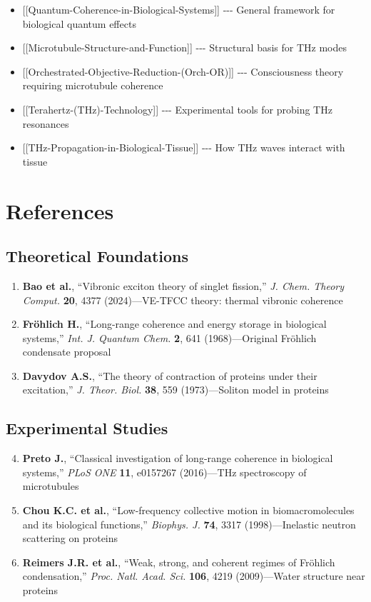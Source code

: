 \begin{itemize}
\tightlist
\item
  {[}{[}Quantum-Coherence-in-Biological-Systems{]}{]} -\/-\/- General
  framework for biological quantum effects
\item
  {[}{[}Microtubule-Structure-and-Function{]}{]} -\/-\/- Structural
  basis for THz modes
\item
  {[}{[}Orchestrated-Objective-Reduction-(Orch-OR){]}{]} -\/-\/-
  Consciousness theory requiring microtubule coherence
\item
  {[}{[}Terahertz-(THz)-Technology{]}{]} -\/-\/- Experimental tools for
  probing THz resonances
\item
  {[}{[}THz-Propagation-in-Biological-Tissue{]}{]} -\/-\/- How THz waves
  interact with tissue
\end{itemize}

\section{References}

\subsection*{Theoretical Foundations}

\begin{enumerate}
\item \textbf{Bao et al.}, ``Vibronic exciton theory of singlet fission,'' \emph{J. Chem. Theory Comput.} \textbf{20}, 4377 (2024)---VE-TFCC theory: thermal vibronic coherence
\item \textbf{Fröhlich H.}, ``Long-range coherence and energy storage in biological systems,'' \emph{Int. J. Quantum Chem.} \textbf{2}, 641 (1968)---Original Fröhlich condensate proposal
\item \textbf{Davydov A.S.}, ``The theory of contraction of proteins under their excitation,'' \emph{J. Theor. Biol.} \textbf{38}, 559 (1973)---Soliton model in proteins
\end{enumerate}

\subsection*{Experimental Studies}

\begin{enumerate}
\setcounter{enumi}{3}
\item \textbf{Preto J.}, ``Classical investigation of long-range coherence in biological systems,'' \emph{PLoS ONE} \textbf{11}, e0157267 (2016)---THz spectroscopy of microtubules
\item \textbf{Chou K.C. et al.}, ``Low-frequency collective motion in biomacromolecules and its biological functions,'' \emph{Biophys. J.} \textbf{74}, 3317 (1998)---Inelastic neutron scattering on proteins
\item
  \textbf{Reimers J.R. et al.}, ``Weak, strong, and coherent regimes of Fröhlich condensation,'' \emph{Proc. Natl. Acad. Sci.} \textbf{106}, 4219 (2009)---Water structure near proteins
\end{enumerate}


